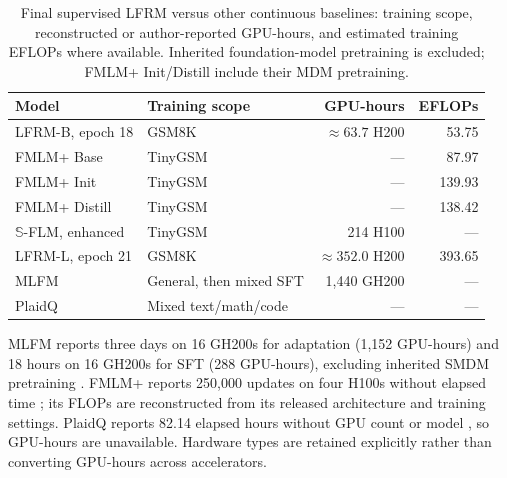 \documentclass{article}
\newenvironment{revision}{\begingroup\color{blue}}{\endgroup}
\begin{document}
\begin{revision}
\begin{table}[htbp]\color{blue}\centering\small
\caption{Final supervised LFRM versus other continuous baselines: training scope, reconstructed or author-reported GPU-hours, and estimated training EFLOPs where available. Inherited foundation-model pretraining is excluded; FMLM+ Init/Distill include their MDM pretraining.}
\label{tab:othertrainingbudgets}
\begin{tabular}{@{}llrr@{}}\toprule
Model & Training scope & GPU-hours & EFLOPs\\\midrule
LFRM-B, epoch 18 & GSM8K & $\approx63.7$ H200 & 53.75\\
FMLM+ Base & TinyGSM & --- & 87.97\\
FMLM+ Init & TinyGSM & --- & 139.93\\
FMLM+ Distill & TinyGSM & --- & 138.42\\
$\mathbb S$-FLM, enhanced & TinyGSM & 214 H100 & ---\\
LFRM-L, epoch 21 & GSM8K & $\approx352.0$ H200 & 393.65\\
MLFM & General, then mixed SFT & 1,440 GH200 & ---\\
PlaidQ & Mixed text/math/code & --- & ---\\\bottomrule
\end{tabular}
\end{table}
MLFM reports three days on 16 GH200s for adaptation (1,152 GPU-hours) and 18 hours on 16 GH200s for SFT (288 GPU-hours), excluding inherited SMDM pretraining \citep[Sections 5.1.2--5.1.3]{mlfm}. FMLM+ reports 250,000 updates on four H100s without elapsed time \citep[Appendix B]{posterior}; its FLOPs are reconstructed from its released architecture and training settings. PlaidQ reports 82.14 elapsed hours without GPU count or model \citep[Appendix B.1]{plaidq}, so GPU-hours are unavailable. Hardware types are retained explicitly rather than converting GPU-hours across accelerators.



\end{revision}
\end{document}
